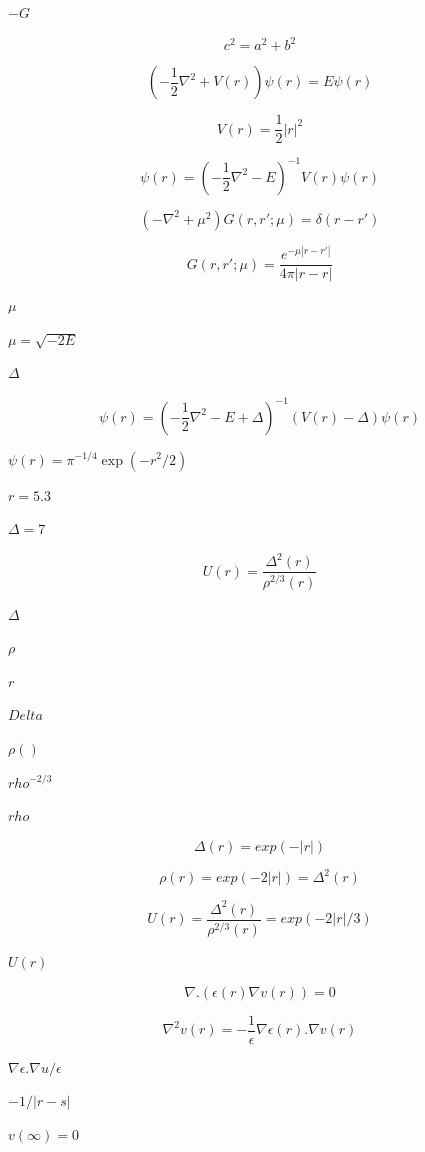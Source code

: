 \documentclass{article}
\begin{document}
$-G$
\pagebreak

\[
c^2 = a^2 + b^2
\]
\pagebreak

\[
\left( -\frac{1}{2} \nabla^2 + V(r) \right) \psi(r) = E \psi(r)
\]
\pagebreak

\[
V(r) = \frac{1}{2} |r|^2
\]
\pagebreak

\[
\psi(r) = \left( -\frac{1}{2} \nabla^2 - E \right)^{-1} V(r) \psi(r)
\]
\pagebreak

\[
\left(-\nabla^2 + \mu^2 \right) G(r,r'; \mu) = \delta(r-r')
\]
\pagebreak

\[
G(r,r'; \mu) = \frac{e^{-\mu |r-r'|}}{4 \pi |r-r|}
\]
\pagebreak

$\mu$
\pagebreak

$\mu = \sqrt{-2 E}$
\pagebreak

$\Delta$
\pagebreak

\[
\psi(r) = \left( -\frac{1}{2} \nabla^2 - E + \Delta \right)^{-1} \left( V(r) -\Delta\right)  \psi(r)
\]
\pagebreak

$\psi(r)=\pi^{-1/4}\exp(-r^2 / 2)$
\pagebreak

$r=5.3$
\pagebreak

$\Delta=7$
\pagebreak

\[
U(r) = \frac{\Delta^2 (r)}{\rho^{2/3} (r)}
\]
\pagebreak

$ \Delta $
\pagebreak

$ \rho $
\pagebreak

$ r $
\pagebreak

$ Delta $
\pagebreak

$ \rho() $
\pagebreak

$ rho^{-2/3} $
\pagebreak

$ rho $
\pagebreak

\[
\Delta(r) = exp(- | r | )
\]
\pagebreak

\[
\rho(r) = exp(- 2 | r | ) = \Delta^2(r)
\]
\pagebreak

\[
U(r) = \frac{\Delta^2 (r)}{\rho^{2/3} (r)} = exp( - 2 | r | / 3)
\]
\pagebreak

$
U(r) $
\pagebreak

\[
\nabla . \left( \epsilon(r) \nabla v(r)  \right) = 0
\]
\pagebreak

\[
   \nabla^2 v(r) = - \frac{1}{\epsilon} \nabla \epsilon(r) .  \nabla v(r)
\]
\pagebreak

$\nabla \epsilon . \nabla u / \epsilon$
\pagebreak

$-1 / |r-s|$
\pagebreak

$v(\infty)=0$
\pagebreak
\end{document}
